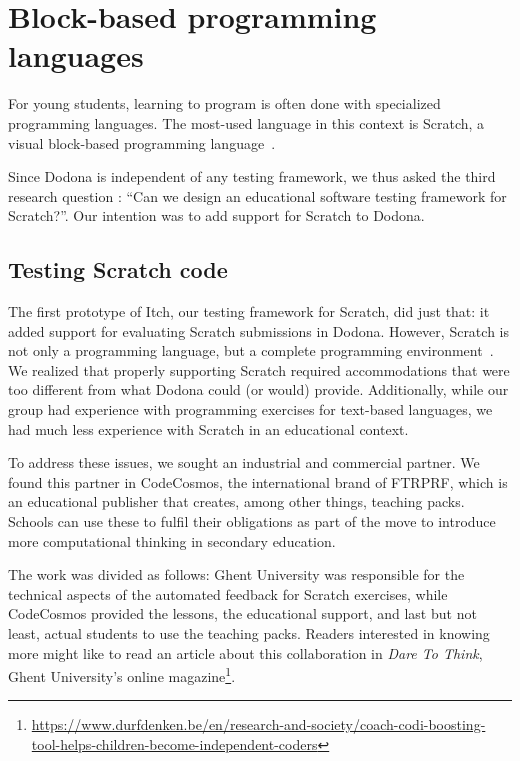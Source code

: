 \documentclass[../main]{subfiles}
\begin{document}
\section{Block-based programming languages}\label{sec:the-second-part:-scratch}

For young students, learning to program is often done with specialized programming languages.
The most-used language in this context is Scratch, a visual block-based programming language~\autocite{resnickScratchProgrammingAll2009}.

Since Dodona is independent of any testing framework, we thus asked the third research question : ``Can we design an educational software testing framework for Scratch?''.
Our intention was to add support for Scratch to Dodona.

\subsection{Testing Scratch code}\label{subsec:testing-scrath-code}

The first prototype of Itch, our testing framework for Scratch, did just that: it added support for evaluating Scratch submissions in Dodona.
However, Scratch is not only a programming language, but a complete programming environment~\autocite{maloneyScratchProgrammingLanguage2010}.
We realized that properly supporting Scratch required accommodations that were too different from what Dodona could (or would) provide.
Additionally, while our group had experience with programming exercises for text-based languages, we had much less experience with Scratch in an educational context.

To address these issues, we sought an industrial and commercial partner.
We found this partner in CodeCosmos, the international brand of FTRPRF, which is an educational publisher that creates, among other things, teaching packs.
Schools can use these to fulfil their obligations as part of the move to introduce more computational thinking in secondary education.

The work was divided as follows: Ghent University was responsible for the technical aspects of the automated feedback for Scratch exercises, while CodeCosmos provided the lessons, the educational support, and last but not least, actual students to use the teaching packs.
Readers interested in knowing more might like to read an article about this collaboration in \textit{Dare To Think}, Ghent University's online magazine\footnote{\url{https://www.durfdenken.be/en/research-and-society/coach-codi-boosting-tool-helps-children-become-independent-coders}}.
\end{document}
